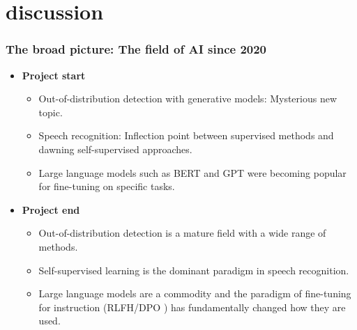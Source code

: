 
\section{discussion}





\begin{frame}
    \frametitle{The broad picture: The field of AI since 2020}
    \begin{itemize}
        \item <1-> [2020] \textbf{Project start}
        \begin{itemize} 
            \item <1-> Out-of-distribution detection with generative models: Mysterious new topic.
            \item <1-> Speech recognition: Inflection point between supervised methods and dawning self-supervised approaches.
            \item <1-> Large language models such as BERT and GPT were becoming popular for fine-tuning on specific tasks.
        \end{itemize}
        \item <2-> [2024] \textbf{Project end}
        \begin{itemize}
            \item <2-> Out-of-distribution detection is a mature field with a wide range of methods.
            \item <2-> Self-supervised learning is the dominant paradigm in speech recognition.
            \item <2-> Large language models are a commodity and the paradigm of fine-tuning for instruction (RLFH/DPO \cite{ouyang_training_2022,rafailov_direct_2024}) has fundamentally changed how they are used.
        \end{itemize}
    \end{itemize}
\end{frame}


